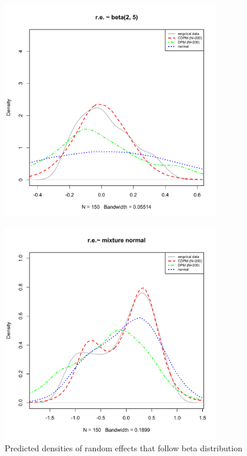 \documentclass[12pt]{article}
\begin{document}
\begin{figure}[H]
\begin{minipage}{0.5\textwidth}
\centering
\includegraphics[width=0.85\textwidth]{ui_beta.pdf}
\label{fig: normal_dpm}
\caption{\small Predicted densities of random effects that follow beta distribution}
\end{minipage}
\hspace{0.5cm}
\begin{minipage}{0.5\textwidth}
\centering
\includegraphics[width=0.85\textwidth]{ui_mixnormal.pdf}

\end{minipage}
\end{figure}
\end{document}
